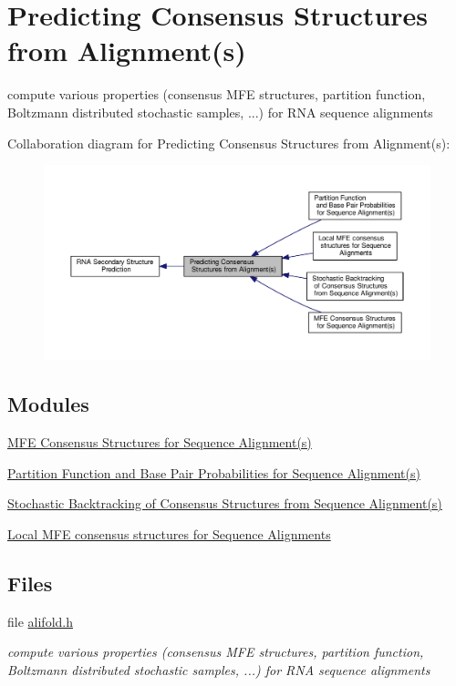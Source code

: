 \hypertarget{group__consensus__fold}{\section{Predicting Consensus Structures from Alignment(s)}
\label{group__consensus__fold}
}


compute various properties (consensus M\-F\-E structures, partition function, Boltzmann distributed stochastic samples, ...) for R\-N\-A sequence alignments  


Collaboration diagram for Predicting Consensus Structures from Alignment(s)\-:
\nopagebreak
\begin{figure}[H]
\begin{center}
\leavevmode
\includegraphics[width=350pt]{group__consensus__fold}
\end{center}
\end{figure}
\subsection*{Modules}
\begin{DoxyCompactItemize}
\item 
\hyperlink{group__consensus__mfe__fold}{M\-F\-E Consensus Structures for Sequence Alignment(s)}
\item 
\hyperlink{group__consensus__pf__fold}{Partition Function and Base Pair Probabilities for Sequence Alignment(s)}
\item 
\hyperlink{group__consensus__stochbt}{Stochastic Backtracking of Consensus Structures from Sequence Alignment(s)}
\item 
\hyperlink{group__local__consensus__fold}{Local M\-F\-E consensus structures for Sequence Alignments}
\end{DoxyCompactItemize}
\subsection*{Files}
\begin{DoxyCompactItemize}
\item 
file \hyperlink{alifold_8h}{alifold.\-h}
\begin{DoxyCompactList}\small\item\em compute various properties (consensus M\-F\-E structures, partition function, Boltzmann distributed stochastic samples, ...) for R\-N\-A sequence alignments \end{DoxyCompactList}\end{DoxyCompactItemize}
